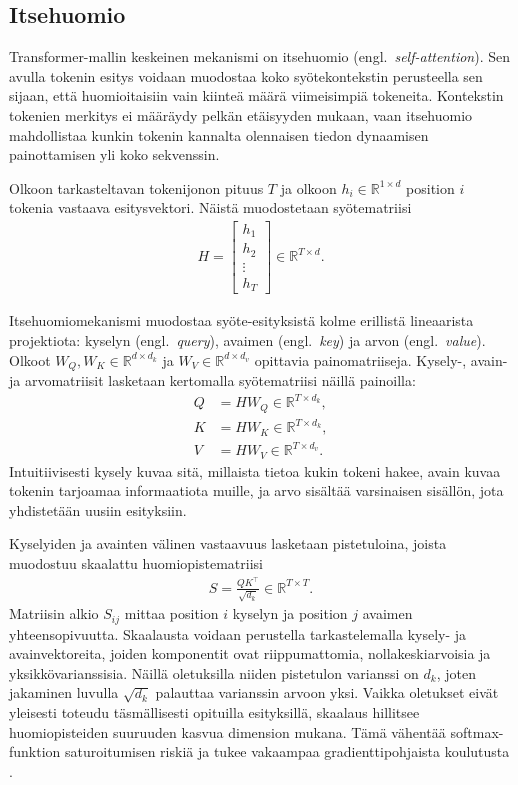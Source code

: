 \subsection{Itsehuomio}

Transformer-mallin keskeinen mekanismi on itsehuomio (engl.\ \emph{self-attention}). Sen avulla tokenin esitys voidaan muodostaa koko syötekontekstin perusteella sen sijaan, että huomioitaisiin vain kiinteä määrä viimeisimpiä tokeneita. Kontekstin tokenien merkitys ei määräydy pelkän etäisyyden mukaan, vaan itsehuomio mahdollistaa kunkin tokenin kannalta olennaisen tiedon dynaamisen painottamisen yli koko sekvenssin.

Olkoon tarkasteltavan tokenijonon pituus \(T\) ja olkoon \(h_i \in \mathbb{R}^{1 \times d}\) position \(i\) tokenia vastaava esitysvektori. Näistä muodostetaan syötematriisi
\begin{align*}
  H
  =
  \begin{bmatrix}
    h_1 \\
    h_2 \\
    \vdots \\
    h_T
  \end{bmatrix}
  \in \mathbb{R}^{T \times d}.
\end{align*}

Itsehuomiomekanismi muodostaa syöte-esityksistä kolme erillistä lineaarista projektiota: kyselyn (engl.\ \emph{query}), avaimen (engl.\ \emph{key}) ja arvon (engl.\ \emph{value}). Olkoot \(W_Q, W_K \in \mathbb{R}^{d \times d_k}\) ja \(W_V \in \mathbb{R}^{d \times d_v}\) opittavia painomatriiseja. Kysely-, avain- ja arvomatriisit lasketaan kertomalla syötematriisi näillä painoilla:
\begin{align*}
  Q &= H W_Q \in \mathbb{R}^{T \times d_k}, \\
  K &= H W_K \in \mathbb{R}^{T \times d_k}, \\
  V &= H W_V \in \mathbb{R}^{T \times d_v}.
\end{align*}
Intuitiivisesti kysely kuvaa sitä, millaista tietoa kukin tokeni hakee, avain kuvaa tokenin tarjoamaa informaatiota muille, ja arvo sisältää varsinaisen sisällön, jota yhdistetään uusiin esityksiin.

Kyselyiden ja avainten välinen vastaavuus lasketaan pistetuloina, joista muodostuu skaalattu huomiopistematriisi
\begin{align*}
  S = \frac{QK^{\top}}{\sqrt{d_k}} \in \mathbb{R}^{T \times T}.
\end{align*}
Matriisin alkio \(S_{ij}\) mittaa position \(i\) kyselyn ja
position \(j\) avaimen yhteensopivuutta. Skaalausta voidaan
perustella tarkastelemalla kysely- ja avainvektoreita, joiden
komponentit ovat riippumattomia, nollakeskiarvoisia ja
yksikkövarianssisia. Näillä oletuksilla niiden pistetulon
varianssi on \(d_k\), joten jakaminen luvulla \(\sqrt{d_k}\)
palauttaa varianssin arvoon yksi. Vaikka oletukset eivät
yleisesti toteudu täsmällisesti opituilla esityksillä,
skaalaus hillitsee huomiopisteiden suuruuden kasvua dimension
mukana. Tämä vähentää softmax-funktion saturoitumisen riskiä
ja tukee vakaampaa gradienttipohjaista koulutusta
\cite{vaswani2017attention}.


